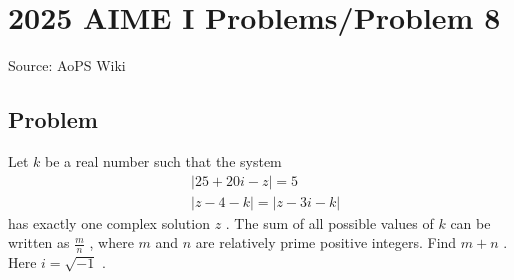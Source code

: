 \documentclass[12pt]{article}
\begin{document}
\section*{{2025 AIME I Problems/Problem 8}}
Source: AoPS Wiki

\subsection*{Problem}
Let $k$ be a real number such that the system
\begin{align*}
&|25 + 20i - z| = 5 \\
&|z - 4 - k| = |z - 3i - k|
\end{align*}
has exactly one complex solution $z$ . The sum of all possible values of $k$ can be written as $\frac{m}{n}$ , where $m$ and $n$ are relatively prime positive integers. Find $m + n$ . Here $i = \sqrt{-1}$ .
\end{document}
